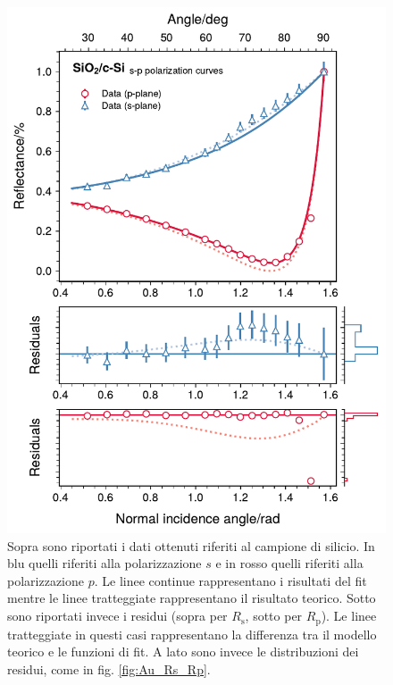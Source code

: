 \documentclass[
    prb,altaffilletter,citeautoscript,
    amsmath,amssymb,
    showpacs,showkeys,floatfix,
    reprint
]{revtex4-1}
\begin{document}
\begin{figure}
    \centering
    \includegraphics[width=\linewidth]{figures/Si_Rs_Rp.pdf}
    \caption{Sopra sono riportati i dati ottenuti riferiti al campione di silicio. In blu quelli riferiti alla polarizzazione $s$ e in rosso quelli riferiti alla polarizzazione $p$. Le linee continue rappresentano i risultati del fit mentre le linee tratteggiate rappresentano il risultato teorico. Sotto sono riportati invece i residui (sopra per $R_\mathrm{s}$, sotto per $R_\mathrm{p}$). Le linee tratteggiate in questi casi rappresentano la differenza tra il modello teorico e le funzioni di fit. A lato sono invece le distribuzioni dei residui, come in fig. \ref{fig:Au_Rs_Rp}.}
    \label{fig:Si_Rs_Rp}
\end{figure}
\end{document}
